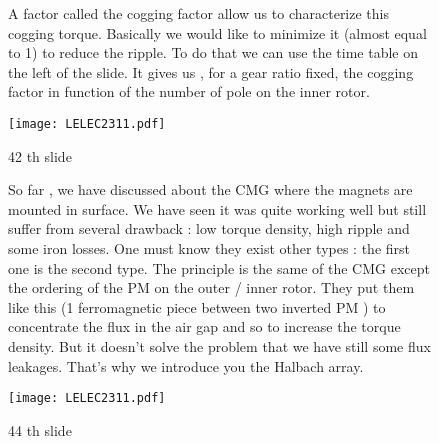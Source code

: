 \begin{figure}[H]
    \begin{minipage}{.45\linewidth}
   A factor called the cogging factor allow us to characterize this cogging torque. Basically we would like to minimize it (almost equal to 1) to reduce the ripple. To do that we can use the time table on the left of the slide. It gives us , for a gear ratio fixed, the cogging factor in function of the number of pole on the inner rotor.

 
       
    \end{minipage}
    \hfill%
    \begin{minipage}[c]{.45\linewidth}
        \centering
        \texttt{[image: LELEC2311.pdf]}
        \caption{42 th slide}
    \end{minipage}
\end{figure}


\begin{figure}[H]
    \begin{minipage}{.45\linewidth}
    So far , we have discussed about the CMG where the magnets are mounted in surface. We have seen it was quite working well but still suffer from several drawback : low torque density, high ripple and some iron losses.
    One must know they exist other types : the first one is the second type. The principle is the same of the CMG except the ordering of the PM on the outer / inner rotor. They put them like this (1 ferromagnetic piece between two inverted PM ) to concentrate the flux in the air gap and so to increase the torque density. But it  doesn't solve the problem that we have still some flux leakages. That's why we introduce you the Halbach array.
       
    \end{minipage}
    \hfill%
    \begin{minipage}[c]{.45\linewidth}
        \centering
        \texttt{[image: LELEC2311.pdf]}
        \caption{44 th slide}
    \end{minipage}
\end{figure}

